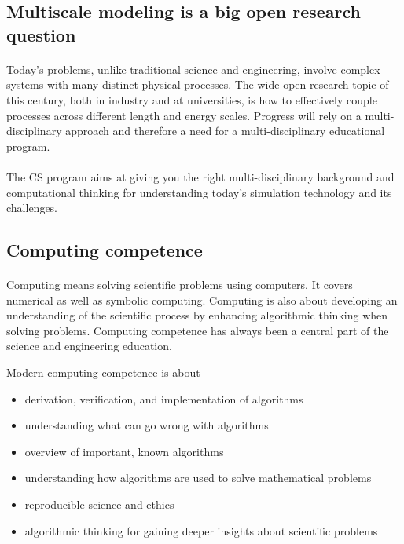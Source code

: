 \documentclass[%
oneside,                 %
final,                   %
10pt]{article}
\begin{document}
\subsection{Multiscale modeling is a big open research question}


\paragraph{}
Today's problems, unlike traditional
science and engineering, involve complex systems with many distinct
physical processes. The wide open research topic of this century, both
in industry and at universities, is how to effectively couple
processes across different length and energy scales. Progress will
rely on a multi-disciplinary approach and therefore a need for
a multi-disciplinary educational program.




\paragraph{}
The CS program aims at giving you  the right
multi-disciplinary background and computational thinking for
understanding today's simulation technology and its challenges.



\subsection{Computing competence}

\paragraph{}
Computing means solving scientific problems using computers. It covers
numerical as well as symbolic computing. Computing is also about
developing an understanding of the scientific process by enhancing
algorithmic thinking when solving problems.  Computing competence has
always been a central part of the science and engineering
education.

Modern computing competence is about

\begin{itemize}
\item derivation, verification, and implementation of algorithms

\item understanding what can go wrong with algorithms

\item overview of important, known algorithms

\item understanding how algorithms are used to solve mathematical problems

\item reproducible science and ethics

\item algorithmic thinking for gaining deeper insights about scientific problems
\end{itemize}
\end{document}
